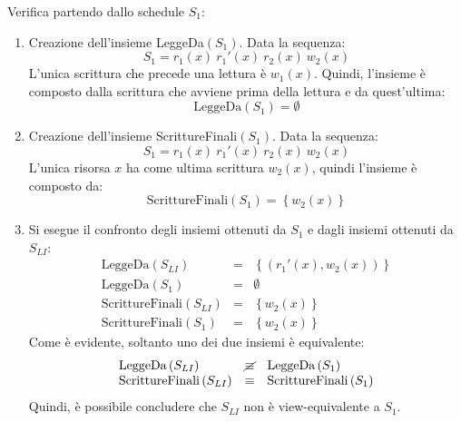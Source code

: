 \documentclass[a4paper]{article}
\begin{document}
	\noindent
	Verifica partendo dallo schedule $S_{1}$:
	\begin{enumerate}
		\item Creazione dell'insieme LeggeDa$\left(S_{1}\right)$. Data la sequenza:
		\begin{equation*}
			S_{1} = r_{1}\left(x\right) \: r_{1}'\left(x\right) \: r_{2}\left(x\right) \: w_{2}\left(x\right)
		\end{equation*}
		L'unica scrittura che precede una lettura è $w_{1}\left(x\right)$. Quindi, l'insieme è composto dalla scrittura che avviene prima della lettura e da quest'ultima:
		\begin{equation*}
			\text{LeggeDa}\left(S_{1}\right) = \emptyset
		\end{equation*}
		
		\item Creazione dell'insieme ScrittureFinali$\left(S_{1}\right)$. Data la sequenza:
		\begin{equation*}
			S_{1} = r_{1}\left(x\right) \: r_{1}'\left(x\right) \: r_{2}\left(x\right) \: w_{2}\left(x\right)
		\end{equation*}
		L'unica risorsa $x$ ha come ultima scrittura $w_{2}\left(x\right)$, quindi l'insieme è composto da:
		\begin{equation*}
			\text{ScrittureFinali}\left(S_{1}\right) = \left\{w_{2}\left(x\right)\right\}
		\end{equation*}
		
		\item Si esegue il confronto degli insiemi ottenuti da $S_{1}$ e dagli insiemi ottenuti da $S_{LI}$:
		\begin{equation*}
			\begin{array}{lll}
				\text{LeggeDa}\left(S_{LI}\right)	&=& \left\{\left(r_{1}'\left(x\right), w_{2}\left(x\right)\right)\right\} \\
				\text{LeggeDa}\left(S_{1}\right)	&=& \emptyset \\
				\text{ScrittureFinali}\left(S_{LI}\right)	&=& \left\{w_{2}\left(x\right)\right\} \\
				\text{ScrittureFinali}\left(S_{1}\right)	&=& \left\{w_{2}\left(x\right)\right\}
			\end{array}
		\end{equation*}
		Come è evidente, soltanto uno dei due insiemi è equivalente:
		\begin{equation*}
			\begin{array}{lll}
				\text{LeggeDa}\left(S_{LI}\right)	&\cancel{\equiv}& \text{LeggeDa}\left(S_{1}\right) \\
				\text{ScrittureFinali}\left(S_{LI}\right)	&\equiv& \text{ScrittureFinali}\left(S_{1}\right)
			\end{array}
		\end{equation*}
		Quindi, è possibile concludere che $S_{LI}$ non è view-equivalente a $S_{1}$.
	\end{enumerate}\newpage
	
\end{document}
